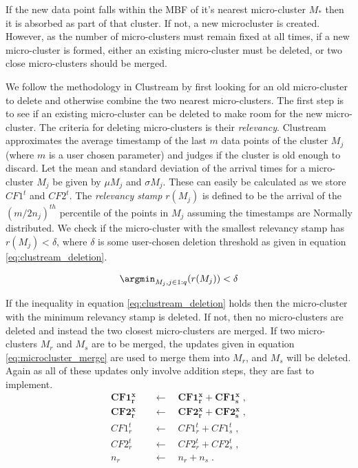 If the new data point falls within the MBF of it's nearest micro-cluster $M_{*}$ then it is absorbed as part of that cluster. If not, a new microcluster is created. However, as the number of micro-clusters must remain fixed at all times, if a new micro-cluster is formed, either an existing micro-cluster must be deleted, or two close micro-clusters should be merged.


 We follow the methodology in Clustream by first looking for an old micro-cluster to delete and otherwise combine the two nearest micro-clusters. The first step is to see if an existing micro-cluster can be deleted to make room for the new micro-cluster. The criteria for deleting micro-clusters is their \textit{relevancy}. Clustream approximates the average timestamp of the last $m$ data points of the cluster $M_j$ (where $m$ is a user chosen parameter) and judges if the cluster is old enough to discard.  Let the mean and standard deviation of the arrival times for a micro-cluster $M_j$ be given by $\mu M_j$ and $\sigma M_j$. These can easily be calculated as we store $CF1^t$ and $CF2^t$. The \textit{relevancy stamp} $r(M_j)$ is defined to be the arrival of the $(m/2n_j)^{th}$ percentile of the points in $M_j$ assuming the timestamps are Normally distributed. We check if the micro-cluster with the smallest relevancy stamp has $r(M_j) < \delta$, where $\delta$ is some user-chosen deletion threshold as given in equation \eqref{eq:clustream_deletion}.

\begin{equation}
  \label{eq:clustream_deletion}
 \argmin_{M_j , j \in 1:q}(r(M_j)) < \delta  
\end{equation}

 If the inequality in equation \eqref{eq:clustream_deletion} holds then the  micro-cluster with the minimum relevancy stamp is deleted. If not, then no micro-clusters are deleted and instead the two closest micro-clusters are merged. If two micro-clusters $M_r$ and $M_s$ are to be merged, the updates given in equation \eqref{eq:microcluster_merge} are used to merge them into $M_r$, and $M_s$ will be deleted. Again as all of these updates only involve addition steps, they are fast to implement. 
\begin{align}
\boldsymbol{CF1^x_r} \quad &\leftarrow \quad \boldsymbol{CF1^x_r} + \boldsymbol{CF1^x_s} \; , \nonumber  \\ 
\boldsymbol{CF2^x_r} \quad &\leftarrow \quad \boldsymbol{CF2^x_r} + \boldsymbol{CF2^x_s} \; , \nonumber\\
CF1^t_r \quad &\leftarrow \quad  CF1^t_r + CF1^t_s\; , \nonumber   \\
CF2^t_r \quad &\leftarrow \quad CF2^t_r +  CF2^t_s\; , \nonumber\\
n_r  \quad &\leftarrow \quad n_r + n_s \; .
\label{eq:microcluster_merge}
\end{align}

